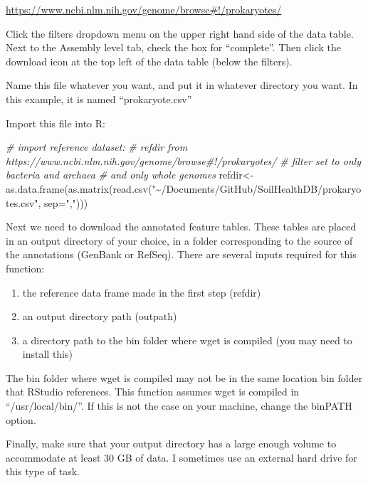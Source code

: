 \documentclass[
]{article}
\newenvironment{Shaded}{\begin{snugshade}}{\end{snugshade}}
\newcommand{\AttributeTok}[1]{\textcolor[rgb]{0.77,0.63,0.00}{#1}}
\newcommand{\CommentTok}[1]{\textcolor[rgb]{0.56,0.35,0.01}{\textit{#1}}}
\newcommand{\FunctionTok}[1]{\textcolor[rgb]{0.00,0.00,0.00}{#1}}
\newcommand{\NormalTok}[1]{#1}
\newcommand{\OtherTok}[1]{\textcolor[rgb]{0.56,0.35,0.01}{#1}}
\newcommand{\StringTok}[1]{\textcolor[rgb]{0.31,0.60,0.02}{#1}}
\providecommand{\tightlist}{%
  \setlength{\itemsep}{0pt}\setlength{\parskip}{0pt}}
\begin{document}
\url{https://www.ncbi.nlm.nih.gov/genome/browse\#!/prokaryotes/}

Click the filters dropdown menu on the upper right hand side of the data
table. Next to the Assembly level tab, check the box for ``complete''.
Then click the download icon at the top left of the data table (below
the filters).

Name this file whatever you want, and put it in whatever directory you
want. In this example, it is named ``prokaryote.csv''

Import this file into R:

\begin{Shaded}
\begin{Highlighting}[]
\CommentTok{\# import reference dataset:}
\CommentTok{\# refdir from https://www.ncbi.nlm.nih.gov/genome/browse\#!/prokaryotes/}
\CommentTok{\# filter set to only bacteria and archaea}
\CommentTok{\# and only whole genomes}
\NormalTok{refdir}\OtherTok{\textless{}{-}}\FunctionTok{as.data.frame}\NormalTok{(}\FunctionTok{as.matrix}\NormalTok{(}\FunctionTok{read.csv}\NormalTok{(}\StringTok{"\textasciitilde{}/Documents/GitHub/SoilHealthDB/prokaryotes.csv"}\NormalTok{, }\AttributeTok{sep=}\StringTok{","}\NormalTok{)))}
\end{Highlighting}
\end{Shaded}

Next we need to download the annotated feature tables. These tables are
placed in an output directory of your choice, in a folder corresponding
to the source of the annotations (GenBank or RefSeq). There are several
inputs required for this function:

\begin{enumerate}
\def\labelenumi{\arabic{enumi})}
\tightlist
\item
  the reference data frame made in the first step (refdir)
\item
  an output directory path (outpath)
\item
  a directory path to the bin folder where wget is compiled (you may
  need to install this)
\end{enumerate}

The bin folder where wget is compiled may not be in the same location
bin folder that RStudio references. This function assumes wget is
compiled in ``/usr/local/bin/''. If this is not the case on your
machine, change the binPATH option.

Finally, make sure that your output directory has a large enough volume
to accommodate at least 30 GB of data. I sometimes use an external hard
drive for this type of task.
\end{document}
